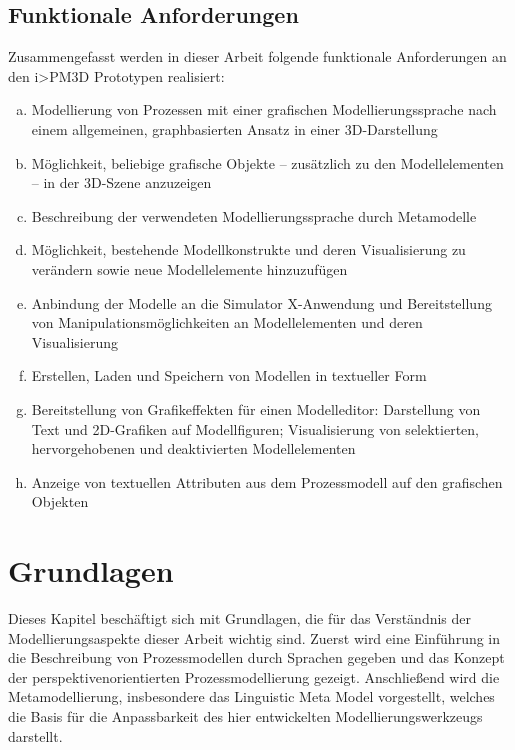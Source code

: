 \documentclass[a4paper,10pt]{sphinxmanual}
\begin{document}
\section{Funktionale Anforderungen}
\label{einleitung:anforderungen}\label{einleitung:funktionale-anforderungen}
Zusammengefasst werden in dieser Arbeit folgende funktionale Anforderungen an den i\textgreater{}PM3D Prototypen realisiert:
\begin{enumerate}[(a)]
\item {} 
Modellierung von Prozessen mit einer grafischen Modellierungssprache nach einem allgemeinen, graphbasierten Ansatz in einer 3D-Darstellung

\item {} 
Möglichkeit, beliebige grafische Objekte – zusätzlich zu den Modellelementen – in der 3D-Szene anzuzeigen

\item {} 
Beschreibung der verwendeten Modellierungssprache durch Metamodelle

\item {} 
Möglichkeit, bestehende Modellkonstrukte und deren Visualisierung zu verändern sowie neue Modellelemente hinzuzufügen

\item {} 
Anbindung der Modelle an die Simulator X-Anwendung und Bereitstellung von Manipulationsmöglichkeiten an Modellelementen und deren Visualisierung

\item {} 
Erstellen, Laden und Speichern von Modellen in textueller Form

\item {} 
Bereitstellung von Grafikeffekten für einen Modelleditor: Darstellung von Text und 2D-Grafiken auf Modellfiguren; Visualisierung von selektierten, hervorgehobenen und deaktivierten Modellelementen

\item {} 
Anzeige von textuellen Attributen aus dem Prozessmodell auf den grafischen Objekten

\end{enumerate}


\chapter{Grundlagen}
\label{grundlagen:grundlagen}\label{grundlagen::doc}
Dieses Kapitel beschäftigt sich mit Grundlagen, die für das Verständnis der Modellierungsaspekte dieser Arbeit wichtig sind.
Zuerst wird eine Einführung in die Beschreibung von Prozessmodellen durch Sprachen gegeben und das Konzept der perspektivenorientierten Prozessmodellierung \cite{jablonski_workflow_1996} gezeigt.
Anschließend wird die Metamodellierung, insbesondere das Linguistic Meta Model \cite{volz_werkzeugunterstutzung_2011} vorgestellt, welches die Basis für die Anpassbarkeit des hier entwickelten Modellierungswerkzeugs darstellt.
\end{document}
